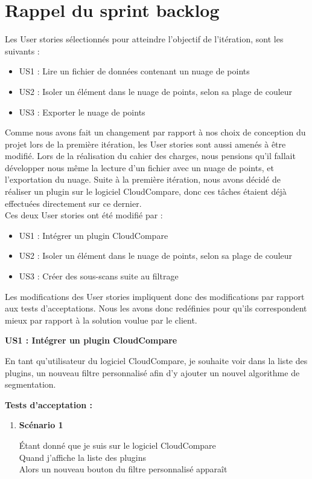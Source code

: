 \documentclass[12pt,titlepage,french]{article}
\begin{document}
\section{Rappel du sprint backlog}

Les User stories sélectionnés pour atteindre l'objectif de l'itération, sont les suivants :

\begin{itemize}
  \item US1 : Lire un fichier de données contenant un nuage de points
  \item US2 : Isoler un élément dans le nuage de points, selon sa plage de couleur
  \item US3 : Exporter le nuage de points
\end{itemize}

Comme nous avons fait un changement par rapport à nos choix de conception du projet lors de la première itération, les User stories sont aussi amenés à être modifié. Lors de la réalisation du cahier des charges, nous pensions qu'il fallait développer nous même la lecture d'un fichier avec un nuage de points, et l'exportation du nuage. Suite à la première itération, nous avons décidé de réaliser un plugin sur le logiciel CloudCompare, donc ces tâches étaient déjà effectuées directement sur ce dernier. \\
Ces deux User stories ont été modifié par : 
\begin{itemize}
  \item US1 : Intégrer un plugin CloudCompare
  \item US2 : Isoler un élément dans le nuage de points, selon sa plage de couleur
  \item US3 : Créer des sous-scans suite au filtrage\\
\end{itemize}

Les modifications des User stories impliquent donc des modifications par rapport aux tests d'acceptations. Nous les avons donc redéfinies pour qu'ils correspondent mieux par rapport à la solution voulue par le client.

\textbf{\og US1 : Intégrer un plugin CloudCompare\fg{}}

En tant qu'utilisateur du logiciel CloudCompare, je souhaite voir dans la liste des plugins, un nouveau filtre personnalisé afin d'y ajouter un nouvel algorithme de segmentation.

\textbf{Tests d'acceptation :}

\begin{enumerate}
    \item \textbf{Scénario 1}

Étant donné que je suis sur le logiciel CloudCompare\\
Quand j'affiche la liste des plugins\\
Alors un nouveau bouton du filtre personnalisé apparaît\\

\end{enumerate}
\end{document}
